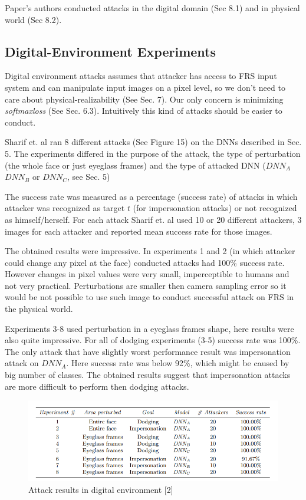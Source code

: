Paper's authors conducted attacks in the digital domain (Sec 8.1) and in physical world (Sec 8.2).

\subsection{Digital-Environment Experiments}

Digital environment attacks assumes that attacker has access to FRS input system and can manipulate input images on a pixel level, so we don't need to care about physical-realizability (See Sec. 7). Our only concern is minimizing \textit{softmaxloss} (See Sec. 6.3). Intuitively this kind of attacks should be easier to conduct. 

Sharif et. al ran 8 different attacks (See Figure 15) on the DNNs described in Sec. 5. The experiments differed in the purpose of the attack, the type of perturbation (the whole face or just eyeglass frames) and the type of attacked DNN ($DNN_A$ $DNN_B$ or $DNN_C$, see Sec. 5)

The success rate was measured as a percentage (success rate) of attacks in which attacker was recognized as target $t$ (for impersonation attacks) or not recognized as himself/herself. For each attack Sharif et. al used 10 or 20 different attackers, 3 images for each attacker and reported mean success rate for those images.

The obtained results were impressive. In experiments 1 and 2 (in which attacker could change any pixel at the face) conducted attacks had 100\% success rate. However changes in pixel values were very small, imperceptible to humans and not very practical. Perturbations are smaller then camera sampling error so it would be not possible to use such image to conduct successful attack on FRS in the physical world. 

Experiments 3-8 used perturbation in a eyeglass frames shape, here results were also quite impressive. For all of dodging experiments (3-5) success rate was 100\%. The only attack that have slightly worst performance result was impersonation attack on $DNN_A$. Here success rate was below 92\%, which might be caused by big number of classes. The obtained results suggest that impersonation attacks are more difficult to perform then dodging attacks.

\begin{figure}[!ht]
  \centering
  \includegraphics[scale=0.7]{Images/digital-env-experiments.png}
  \caption{Attack results in digital environment [2]}
  \label{figurelabel}
\end{figure}

